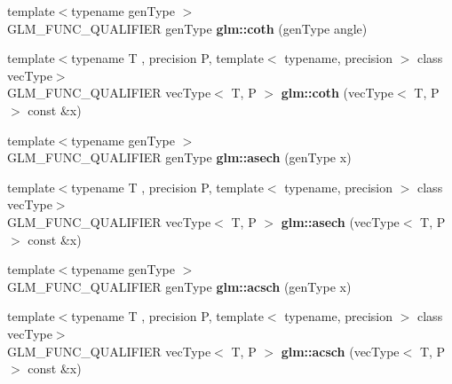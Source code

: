 \begin{DoxyCompactItemize}
\item 
\hypertarget{namespaceglm_aa834c9345990c5373d6358732ea2fc03}{{\footnotesize template$<$typename gen\-Type $>$ }\\G\-L\-M\-\_\-\-F\-U\-N\-C\-\_\-\-Q\-U\-A\-L\-I\-F\-I\-E\-R gen\-Type {\bfseries glm\-::coth} (gen\-Type angle)}\label{namespaceglm_aa834c9345990c5373d6358732ea2fc03}

\item 
\hypertarget{namespaceglm_ab851ec044cf6fe8cecb0c3d15359b110}{{\footnotesize template$<$typename T , precision P, template$<$ typename, precision $>$ class vec\-Type$>$ }\\G\-L\-M\-\_\-\-F\-U\-N\-C\-\_\-\-Q\-U\-A\-L\-I\-F\-I\-E\-R vec\-Type$<$ T, P $>$ {\bfseries glm\-::coth} (vec\-Type$<$ T, P $>$ const \&x)}\label{namespaceglm_ab851ec044cf6fe8cecb0c3d15359b110}

\item 
\hypertarget{namespaceglm_a8e7a1d844fe8d81ceb0b6642e026ae2f}{{\footnotesize template$<$typename gen\-Type $>$ }\\G\-L\-M\-\_\-\-F\-U\-N\-C\-\_\-\-Q\-U\-A\-L\-I\-F\-I\-E\-R gen\-Type {\bfseries glm\-::asech} (gen\-Type x)}\label{namespaceglm_a8e7a1d844fe8d81ceb0b6642e026ae2f}

\item 
\hypertarget{namespaceglm_afa41f1f0dd76e071da4cece561ae17f2}{{\footnotesize template$<$typename T , precision P, template$<$ typename, precision $>$ class vec\-Type$>$ }\\G\-L\-M\-\_\-\-F\-U\-N\-C\-\_\-\-Q\-U\-A\-L\-I\-F\-I\-E\-R vec\-Type$<$ T, P $>$ {\bfseries glm\-::asech} (vec\-Type$<$ T, P $>$ const \&x)}\label{namespaceglm_afa41f1f0dd76e071da4cece561ae17f2}

\item 
\hypertarget{namespaceglm_ae63e088add8044453b4a0dc31ec19ca6}{{\footnotesize template$<$typename gen\-Type $>$ }\\G\-L\-M\-\_\-\-F\-U\-N\-C\-\_\-\-Q\-U\-A\-L\-I\-F\-I\-E\-R gen\-Type {\bfseries glm\-::acsch} (gen\-Type x)}\label{namespaceglm_ae63e088add8044453b4a0dc31ec19ca6}

\item 
\hypertarget{namespaceglm_a1c7038712456676487a9be253281aa72}{{\footnotesize template$<$typename T , precision P, template$<$ typename, precision $>$ class vec\-Type$>$ }\\G\-L\-M\-\_\-\-F\-U\-N\-C\-\_\-\-Q\-U\-A\-L\-I\-F\-I\-E\-R vec\-Type$<$ T, P $>$ {\bfseries glm\-::acsch} (vec\-Type$<$ T, P $>$ const \&x)}\label{namespaceglm_a1c7038712456676487a9be253281aa72}


\end{DoxyCompactItemize}
